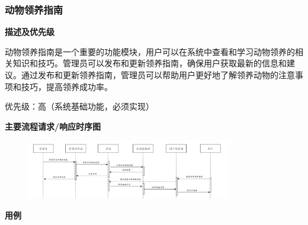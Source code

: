 \documentclass[12pt,a4paper,UTF8]{article}
\begin{document}
\subsubsection{动物领养指南}

\noindent\textbf{描述及优先级}

动物领养指南是一个重要的功能模块，用户可以在系统中查看和学习动物领养的相关知识和技巧。管理员可以发布和更新领养指南，确保用户获取最新的信息和建议。通过发布和更新领养指南，管理员可以帮助用户更好地了解领养动物的注意事项和技巧，提高领养成功率。

优先级：高（系统基础功能，必须实现）

\noindent\textbf{主要流程请求/响应时序图}

\begin{figure}[H]
  \centering
  \includegraphics[width=0.8\textwidth]{figures/use326.png} 
\end{figure}

\noindent\textbf{用例}
\end{document}
